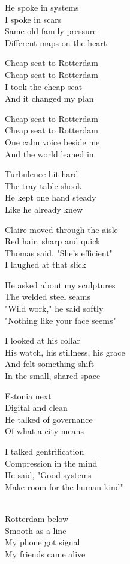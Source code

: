 \begin{lyrics}
He spoke in systems\\
I spoke in scars\\
Same old family pressure\\
Different maps on the heart

Cheap seat to Rotterdam\\
Cheap seat to Rotterdam\\
I took the cheap seat\\
And it changed my plan

Cheap seat to Rotterdam\\
Cheap seat to Rotterdam\\
One calm voice beside me\\
And the world leaned in

Turbulence hit hard\\
The tray table shook\\
He kept one hand steady\\
Like he already knew

Claire moved through the aisle\\
Red hair, sharp and quick\\
Thomas said, "She's efficient"\\
I laughed at that slick

He asked about my sculptures\\
The welded steel seams\\
"Wild work," he said softly\\
"Nothing like your face seems"

I looked at his collar\\
His watch, his stillness, his grace\\
And felt something shift\\
In the small, shared space

Estonia next\\
Digital and clean\\
He talked of governance\\
Of what a city means

I talked gentrification\\
Compression in the mind\\
He said, "Good systems\\
Make room for the human kind"

\\
Rotterdam below\\
Smooth as a line\\
My phone got signal\\
My friends came alive


\end{lyrics}
